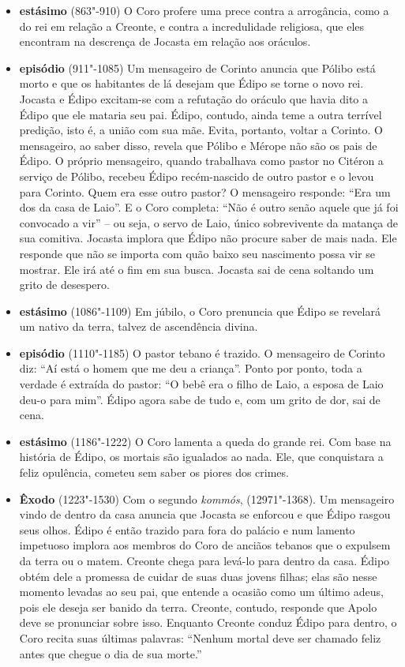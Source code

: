 \begin{itemize}
\item \textbf{ estásimo} (863"-910) O Coro profere uma prece
contra a arrogância, como a do rei em relação a Creonte, e contra a
incredulidade religiosa, que eles encontram na descrença de Jocasta em
relação aos oráculos.

\item \textbf{ episódio} (911"-1085) Um mensageiro de
Corinto anuncia que Pólibo está morto e que os habitantes de lá desejam
que Édipo se torne o novo rei. Jocasta e Édipo excitam-se com a
refutação do oráculo que havia dito a Édipo que ele mataria seu pai.
Édipo, contudo, ainda teme a outra terrível predição, isto é, a união
com sua mãe. Evita, portanto, voltar a Corinto. O mensageiro, ao saber
disso, revela que Pólibo e Mérope não são os pais de Édipo. O próprio
mensageiro, quando trabalhava como pastor no Citéron a serviço de
Pólibo, recebeu Édipo recém-nascido de outro pastor e o levou para
Corinto. Quem era esse outro pastor? O mensageiro responde: ``Era um dos
da casa de Laio''. E o Coro completa: ``Não é outro senão aquele que já
foi convocado a vir'' -- ou seja, o servo de Laio, único sobrevivente da
matança de sua comitiva. Jocasta implora que Édipo não procure saber de
mais nada. Ele responde que não se importa com quão baixo seu nascimento
possa vir se mostrar. Ele irá até o fim em sua busca. Jocasta sai de
cena soltando um grito de desespero.

\item \textbf{ estásimo} (1086"-1109) Em júbilo, o Coro
prenuncia que Édipo se revelará um nativo da terra, talvez de
ascendência divina.

\item \textbf{ episódio} (1110"-1185) O pastor tebano é
trazido. O mensageiro de Corinto diz: ``Aí está o homem que me deu a
criança''. Ponto por ponto, toda a verdade é extraída do pastor: ``O
bebê era o filho de Laio, a esposa de Laio deu-o para mim''. Édipo agora
sabe de tudo e, com um grito de dor, sai de cena.

\item \textbf{ estásimo} (1186"-1222) O Coro lamenta a queda
do grande rei. Com base na história de Édipo, os mortais são igualados
ao nada. Ele, que conquistara a feliz opulência, cometeu sem saber os
piores dos crimes.

\item \textbf{Êxodo} (1223"-1530) Com o segundo \emph{kommós},
(12971"-1368). Um mensageiro vindo de dentro da casa anuncia que Jocasta
se enforcou e que Édipo rasgou seus olhos. Édipo é então trazido para
fora do palácio e num lamento impetuoso implora aos membros do Coro de
anciãos tebanos que o expulsem da terra ou o matem. Creonte chega para
levá-lo para dentro da casa. Édipo obtém dele a promessa de cuidar de
suas duas jovens filhas; elas são nesse momento levadas ao seu pai, que
entende a ocasião como um último adeus, pois ele deseja ser banido da
terra. Creonte, contudo, responde que Apolo deve se pronunciar sobre
isso. Enquanto Creonte conduz Édipo para dentro, o Coro recita suas
últimas palavras: ``Nenhum mortal deve ser chamado feliz antes que
chegue o dia de sua morte.''
\end{itemize}